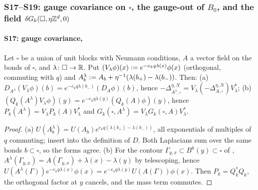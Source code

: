 
\subsubsection{S17--S19: gauge covariance on $\square$, the gauge-out of $B_0$, and the field $\delta G_k(\square,\eta\mathbb Z^d,0)$}\label{sup4:ssec:S17}

\paragraph*{S17: gauge covariance, \cite[p.~433]{Ba3}}

\begin{lemma}\label{sup4:lem:S171}
Let $\square$ be a union of unit blocks with Neumann conditions, $A$ a vector field on the bonds of $\square$, and $\lambda\colon\square\to\mathbb R$. Put $(V_\lambda\phi)(x):= e^{-e_kq\lambda(x)}\phi(x)$ (orthogonal, commuting with $q$) and $A^\lambda_b:= A_b+\eta^{-1}(\lambda(b_+)-\lambda(b_-))$. Then: \textup{(a)} $D_{A^\lambda}(V_\lambda\phi)(b)=e^{-e_kq\lambda(b_-)}(D_A\phi)(b)$, hence $-\Delta^{\eta,N}_{A^\lambda,\square}=V_\lambda(-\Delta^{\eta,N}_{A,\square})V_\lambda^*$; \textup{(b)} $(Q_k(A^\lambda)V_\lambda\phi)(y)=e^{-e_kq\lambda(y)}(Q_k(A)\phi)(y)$, hence $P_k(A^\lambda)=V_\lambda P_k(A)V_\lambda^*$ and $G_k(\square,A^\lambda)=V_\lambda G_k(\square,A)V_\lambda^*$.
\end{lemma}

\begin{proof}
(a) $U(A^\lambda_b)=U(A_b)e^{e_kq(\lambda(b_+)-\lambda(b_-))}$, all exponentials of multiples of $q$ commuting; insert into the definition of $D$. Both Laplacians sum over the same bonds $b\subset\square$, so the forms agree. (b) For the contour $\Gamma_{y,x}\subset B^k(y)\subset\square$ of \cite[(2.1)]{Ba1}, $A^\lambda(\Gamma_{y,x})=A(\Gamma_{y,x})+\lambda(x)-\lambda(y)$ by telescoping, hence $U(A^\lambda(\Gamma))e^{-e_kq\lambda(x)}\phi(x)=e^{-e_kq\lambda(y)}U(A(\Gamma))\phi(x)$. Then $P_k=Q_k^*Q_k$, the orthogonal factor at $y$ cancels, and the mass term commutes.
\end{proof}

